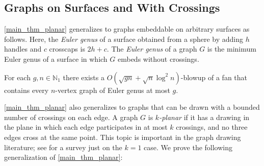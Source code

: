 \documentclass{patmorin}
\renewcommand{\geq}{\geqslant}
\renewcommand{\leq}{\leqslant}
\newcommand{\defin}[1]{\emph{\textcolor{brightmaroon}{#1}}}
\DeclareMathOperator{\pw}{pw}
\newcommand{\NN}{\mathbb{N}}
\begin{document}


\subsection{Graphs on Surfaces and With Crossings}

\cref{main_thm_planar} generalizes to graphs embeddable on arbitrary surfaces as follows. Here, the \defin{Euler genus} of a surface obtained from a sphere by adding $h$ handles and $c$ crosscaps is $2h+c$. The \defin{Euler genus} of a graph $G$ is the minimum Euler genus of a surface in which $G$ embeds without crossings.

\begin{thm}\label{main_thm_genus}
    For each $g,n\in\NN_1$ there exists a $O(\sqrt{gn}+\sqrt{n}\log^2n)$-blowup of a fan that contains every $n$-vertex graph of Euler genus at most $g$.
\end{thm}


\cref{main_thm_planar} also generalizes to graphs that can be drawn with a bounded number of crossings on each edge. A graph $G$ is \defin{$k$-planar} if it has a drawing in the plane in which each edge participates in at most $k$ crossings, and no three edges cross at the same point. This topic is important in the graph drawing literature; see \cite{KLM17} for a survey just on the $k=1$ case. We prove the following generalization of \cref{main_thm_planar}:
\end{document}
